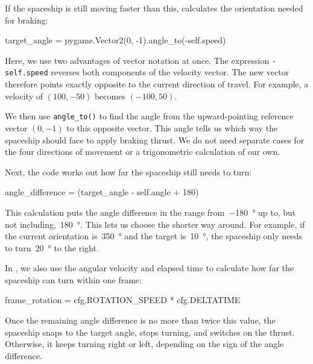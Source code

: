 If the spaceship is still moving faster than this,  calculates the orientation needed for braking:
\begin{codebox}
	target_angle = pygame.Vector2(0, -1).angle_to(-self.speed) %
\end{codebox}

Here, we use two advantages of vector notation at once. The expression \texttt{-self.speed} reverses both components of the velocity vector. The new vector therefore points exactly opposite to the current direction of travel. For example, a velocity of $(100, -50)$ becomes $(-100, 50)$.

We then use \texttt{angle\_to()} to find the angle from the upward-pointing reference vector $(0, -1)$ to this opposite vector. This angle tells us which way the spaceship should face to apply braking thrust. We do not need separate cases for the four directions of movement or a trigonometric calculation of our own.

Next, the code works out how far the spaceship still needs to turn:
\begin{codebox}
	angle_difference = (target_angle - self.angle + 180) %
\end{codebox}

This calculation puts the angle difference in the range from~\SI{-180}{\degree} up to, but not including,~\SI{180}{\degree}. This lets us choose the shorter way around. For example, if the current orientation is~\SI{350}{\degree} and the target is~\SI{10}{\degree}, the spaceship only needs to turn~\SI{20}{\degree} to the right.

In , we also use the angular velocity and elapsed time to calculate how far the spaceship can turn within one frame:
\begin{codebox}
	frame_rotation = cfg.ROTATION_SPEED * cfg.DELTATIME
\end{codebox}

Once the remaining angle difference is no more than twice this value, the spaceship snaps to the target angle, stops turning, and switches on the thrust. Otherwise, it keeps turning right or left, depending on the sign of the angle difference.


